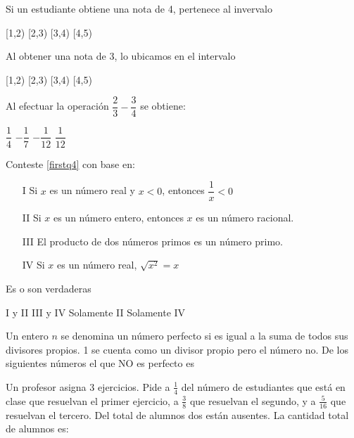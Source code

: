 \documentclass[10pt,letterpaper,addpoints]{exam}
\begin{document}
\begin{multicols}{2}
\begin{questions}
\begin{oneparchoices}
\end{oneparchoices}
\question Si un estudiante obtiene una nota de 4, pertenece al invervalo

\begin{oneparchoices}
 \choice [1,2) 
 \choice [2,3)
 \choice [3,4)
 \CorrectChoice [4,5)
\end{oneparchoices}
\question \label{lastq2} Al obtener una nota de 3, lo ubicamos en el intervalo

\begin{oneparchoices}
 \choice [1,2)
 \choice [2,3)
 \CorrectChoice [3,4)
 \choice [4,5)
\end{oneparchoices}
\question Al efectuar la operación $\dfrac{2}{3}-\dfrac{3}{4}$ se obtiene:

\begin{oneparchoices}
\choice $\dfrac{1}{4}$
\choice $-\dfrac{1}{7}$
\CorrectChoice $-\dfrac{1}{12}$
\choice $\dfrac{1}{12}$
\end{oneparchoices}
\begin{uplevel}{Conteste \ref{firstq4} con base en:
\begin{enumerate}
 \item[I] Si $x$ es un número real y $x<0$, entonces $\dfrac{1}{x}<0$
 \item[II] Si $x$ es un número entero, entonces $x$ es un número racional.
 \item[III] El producto de dos números primos es un número primo.
 \item[IV] Si $x$ es un número real, $\sqrt{x^{2}}=x$
\end{enumerate}
 }
\end{uplevel}
\question \label{firstq4} Es o son verdaderas

\begin{choices}
 \CorrectChoice I y II
 \choice III y IV
 \choice Solamente II
 \choice Solamente IV
\end{choices}
\question Un entero $n$ se denomina un número perfecto si es igual a la suma de todos sus divisores propios. 1 se cuenta como un divisor propio pero el número no. De los siguientes números el que NO es perfecto es

\begin{oneparchoices}
\end{oneparchoices}
\question Un profesor asigna 3 ejercicios. Pide a $\frac{1}{4}$ del número de estudiantes que está en clase que resuelvan el primer ejercicio, a $\frac{3}{8}$ que resuelvan el segundo, y a $\frac{5}{16}$ que resuelvan el tercero. Del total de alumnos dos están ausentes. La cantidad total de alumnos es:


\end{questions}
\end{multicols}
\end{document}
